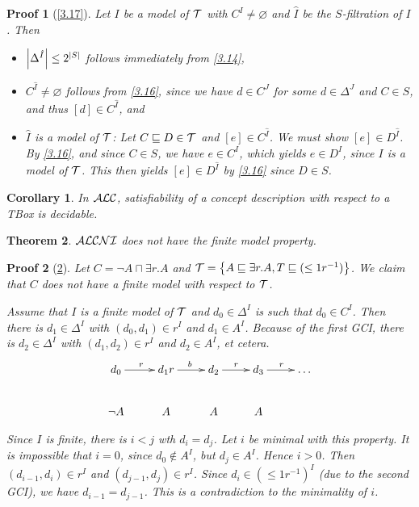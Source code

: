 \documentclass[openany]{scrbook}
\theoremstyle{break}
\newtheorem{Theorem}{Theorem}[chapter]
\newtheorem{Corollary}[Theorem]{Corollary}
\theoremstyle{nonumberbreak}
\theoremstyle{nonumberplain}
\theoremstyle{nonumberbreak}
\newtheorem{Proof}{Proof}
\newcommand{\then}{\Longrightarrow}
\newcommand{\abs}[2][]{\left|{#2}\right|\ifx#1\then\else_{#1}\fi}
\newcommand{\set}[1]{\left\{#1\right\}}
\newcommand{\ALC}{{\cal A}{\cal L}{\cal C}}
\newcommand{\ALCNI}{{\cal A}{\cal L}{\cal C}{\cal N}{\cal I}}
\begin{document}
\begin{Proof}[\cref{3.17}]
  Let $I$ be a model of ${\cal T}$ with $C^I \ne \varnothing$ and
  $\hat{I}$ be the $S$-filtration of $I$. Then
  \begin{itemize}
  \item $\abs{\Delta^{\hat{I}}} \leq 2^{\abs{S}}$ follows immediately
    from \cref{3.14},
  \item $C^{\hat{I}} \ne \varnothing$ follows from \cref{3.16}, since
    we have $d \in C^J$ for some $d \in \Delta^J$ and $C \in S$, and
    thus $[d] \in C^{\hat{I}}$, and
  \item $\hat{I}$ is a model of ${\cal T}$: Let $C \sqsubseteq D \in
    {\cal T}$ and $[e] \in C^{\hat{I}}$. We must show $[e] \in
    D^{\hat{I}}$. By \cref{3.16}, and since $C \in S$, we have $e \in
    C^I$, which yields $e \in D^I$, since $I$ is a model of ${\cal
      T}$. This then yields $[e] \in D^{\hat{I}}$ by \cref{3.16} since
    $D \in S$.
  \end{itemize}
\end{Proof}

\begin{Corollary}
  \label{3.17b}
  In $\ALC$, satisfiability of a concept description with respect to a
  TBox is decidable.
\end{Corollary}

\begin{Theorem}
  \label{3.18}
  $\ALCNI$ does not have the finite model property.
\end{Theorem}

\begin{Proof}[\cref{3.18}]
  Let $C = \neg A \sqcap \exists r. A$ and ${\cal T} = \set{ A
    \sqsubseteq \exists r.A, T \sqsubseteq (\leq 1 r^{-1})}$. We claim
  that $C$ does not have a finite model with respect to ${\cal T}$.

  Assume that $I$ is a finite model of ${\cal T}$ and $d_0 \in
  \Delta^I$ is such that $d_0 \in C^I$. Then there is $d_1 \in
  \Delta^I$ with $(d_0, d_1) \in r^I$ and $d_1 \in A^I$. Because of
  the first GCI, there is $d_2 \in \Delta^I$ with $(d_1, d_2) \in r^I$
  and $d_2 \in A^I$, et cetera.
  \begin{equation*}
    \xymatrix{d_0 \ar[r]^r & d_1 \ar[r]^br & d_2 \ar[r]^r & d_3
      \ar[r]^r & \dotso \\
      \neg A & A & A & A}
  \end{equation*}

  Since $I$ is finite, there is $i < j$ wth $d_i = d_j$. Let $i$ be
  minimal with this property. It is impossible that $i = 0$, since
  $d_0 \not\in A^I$, but $d_j \in A^I$. Hence $i > 0$. Then $(d_{i -
    1}, d_i) \in r^I$ and $(d_{j - 1}, d_j) \in r^I$. Since $d_i \in
  (\leq 1 r^{-1})^I$ (due to the second GCI), we have $d_{i - 1} =
  d_{j - 1}$. This is a contradiction to the minimality of $i$.
\end{Proof}
\end{document}
